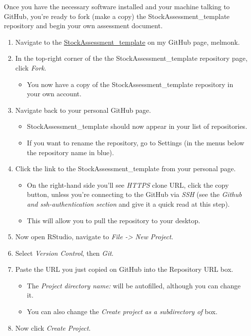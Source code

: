 \documentclass[12pt,]{article}
\providecommand{\tightlist}{%
  \setlength{\itemsep}{0pt}\setlength{\parskip}{0pt}}
\begin{document}
Once you have the necessary software installed and your machine talking
to GitHub, you're ready to fork (make a copy) the
StockAssessment\_template repository and begin your own assessment
document.

\begin{enumerate}
\def\labelenumi{\arabic{enumi}.}
\tightlist
\item
  Navigate to the
  \href{https://github.com/melmonk/StockAssessment_template}{StockAssessment\_template}
  on my GitHub page, melmonk.
\item
  In the top-right corner of the the StockAssessment\_template
  repository page, click \emph{Fork}.

  \begin{itemize}
  \tightlist
  \item
    You now have a copy of the StockAssessment\_template repository in
    your own account.
  \end{itemize}
\item
  Navigate back to your personal GitHub page.

  \begin{itemize}
  \tightlist
  \item
    StockAssessment\_template should now appear in your list of
    repositories.
  \item
    If you want to rename the repository, go to Settings (in the menus
    below the repository name in blue).
  \end{itemize}
\item
  Click the link to the StockAssessment\_template from your personal
  page.

  \begin{itemize}
  \tightlist
  \item
    On the right-hand side you'll see \emph{HTTPS} clone URL, click the
    copy button, unless you're connecting to the GitHub via \emph{SSH}
    (see the \emph{Github and ssh-authentication section} and give it a
    quick read at this step).
  \item
    This will allow you to pull the repository to your desktop.
  \end{itemize}
\item
  Now open RStudio, navigate to \emph{File -\textgreater{} New Project}.
\item
  Select \emph{Version Control}, then \emph{Git}.
\item
  Paste the URL you just copied on GitHub into the Repository URL box.

  \begin{itemize}
  \tightlist
  \item
    The \emph{Project directory name:} will be autofilled, although you
    can change it.
  \item
    You can also change the \emph{Create project as a subdirectory of}
    box.
  \end{itemize}
\item
  Now click \emph{Create Project}.


\end{enumerate}
\end{document}
